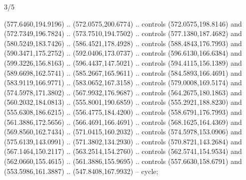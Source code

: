 \begin{flagdescription}{3/5}
\begin{scope}[xshift=0.5\flaglength]
\begin{scope}[scale=0.00167\flagwidth,yshift=210.9mm,xshift=-175.8mm]
\begin{scope}[y=-1pt, x=1pt]
  (577.6460,194.9196) .. (572.0575,200.6774) .. controls (572.0575,198.8146) and
  (572.7349,196.7824) .. (573.7510,194.7502) .. controls (577.1380,187.4682) and
  (580.5249,183.7426) .. (586.4521,178.4928) .. controls (588.4843,176.7993) and
  (590.3471,175.2752) .. (592.0406,173.0737) .. controls (596.6130,166.6384) and
  (599.3226,156.8163) .. (596.4437,147.5021) .. controls (594.4115,156.1389) and
  (589.6698,162.5741) .. (585.2667,165.9611) .. controls (584.5893,166.4691) and
  (583.9119,166.9771) .. (583.0652,167.3158) .. controls (579.0008,169.5174) and
  (574.5978,171.3802) .. (567.9932,176.9687) .. controls (564.2675,180.1863) and
  (560.2032,184.0813) .. (555.8001,190.6859) .. controls (555.2921,188.8230) and
  (555.6308,186.6215) .. (556.4775,184.4200) .. controls (558.6791,176.7993) and
  (561.3886,172.5656) .. (566.4691,166.4691) .. controls (568.1625,164.4369) and
  (569.8560,162.7434) .. (571.0415,160.2032) .. controls (574.5978,153.0906) and
  (575.6139,143.0991) .. (571.3802,134.2930) .. controls (570.8721,143.2684) and
  (567.1464,150.2117) .. (563.2514,154.2760) .. controls (562.5741,154.9534) and
  (562.0660,155.4615) .. (561.3886,155.9695) .. controls (557.6630,158.6791) and
  (553.5986,161.3887) .. (547.8408,167.9932) -- cycle;
\end{scope}
\end{scope}
\end{scope}
\fi
\framecode{}
\end{flagdescription}
